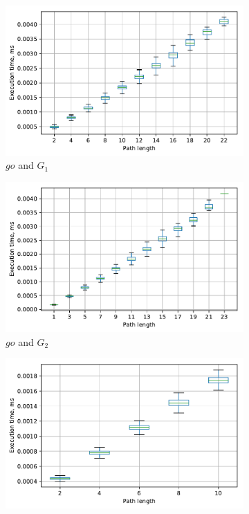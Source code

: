 \begin{figure}
	\begin{subfigure}{0.32\textwidth}
		\includegraphics[width=\linewidth,trim=0 0 -1.5cm 0]{plots/G1_go.pdf}
		\caption{$go$ and $G_1$} \label{fig:extractTimeGoG1}
	\end{subfigure}
	\hspace*{\fill} %
	\begin{subfigure}{0.32\textwidth}
		\includegraphics[width=\linewidth,trim=0 0 -1.5cm 0]{plots/G2_go.pdf}
		\caption{$go$ and $G_2$} \label{fig:extractTimeGoG2}
	\end{subfigure}
	\hspace*{\fill} %
	\begin{subfigure}{0.32\textwidth}
		\includegraphics[width=\linewidth,trim=0 0 -1.5cm 0]{plots/Geo_geospicies.pdf}

\end{subfigure}
\end{figure}
